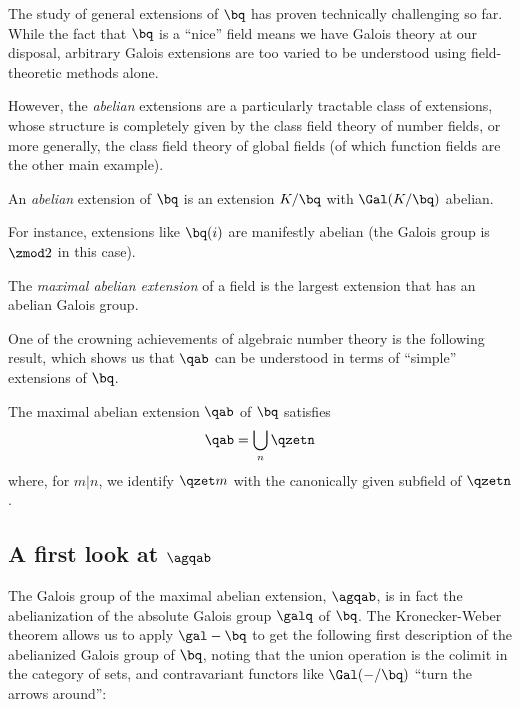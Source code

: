 The study of general extensions of $\bq$ has proven technically challenging so
far. While the fact that $\bq$ is a ``nice'' field means we have Galois theory
at our disposal, arbitrary Galois extensions are too varied to be understood
using field-theoretic methods alone.

However, the \textit{abelian} extensions are a particularly tractable class
of extensions, whose structure is completely given by the class field theory of
number fields, or more generally, the class field theory of global fields (of
which function fields are the other main example).

\begin{defn}
  An \textit{abelian} extension of $\bq$ is an extension $K/\bq$ with
  $\Gal(K/\bq)$ abelian.
\end{defn}

For instance, extensions like $\bq(i)$ are manifestly abelian (the Galois group
is $\zmod 2$ in this case).

\begin{defn}
  The \textit{maximal abelian extension} of a field is the largest extension
  that has an abelian Galois group.
\end{defn}

One of the crowning achievements of algebraic number theory is the following
result, which shows us that $\qab$ can be understood in terms of ``simple''
extensions of $\bq$.

\begin{thm}
  The maximal abelian extension $\qab$ of $\bq$ satisfies
  \[ \qab = \bigcup_n \qzetn \]
  where, for $m|n$, we identify $\qzet m$ with the canonically given subfield of
  $\qzetn$.
\end{thm}

\subsection{A first look at $\agqab$}

The Galois group of the maximal abelian extension, $\agqab$, is in fact the
abelianization of the absolute Galois group $\galq$ of $\bq$.
The Kronecker-Weber theorem allows us to apply $\gal - \bq$ to get the following
first description of the abelianized Galois group of $\bq$, noting that the
union operation is the colimit in the category of sets, and contravariant
functors like $\Gal(-/\bq)$ ``turn the arrows around'':

